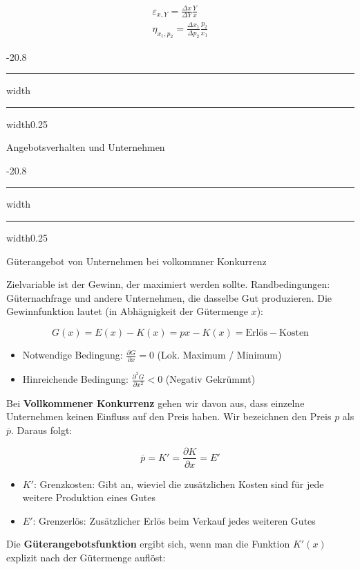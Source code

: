 \documentclass[9pt, landscape, fleqn]{scrartcl}
\makeatletter
\renewcommand{\section}{\@startsection{section}{1}{0mm}%
{-2\baselineskip}{0.8\baselineskip}%
{\hrule depth 0.2pt width\columnwidth\hrule depth1.5pt
width0.25\columnwidth\vspace*{1.2em}\Large\bfseries\rmfamily}}
\renewcommand{\subsection}{\@startsection{subsection}{1}{0mm}%
{-2\baselineskip}{0.8\baselineskip}%
{\hrule depth 0.2pt width\columnwidth\hrule depth0.75pt
width0.25\columnwidth\vspace*{1.2em}\large\bfseries\rmfamily}}
\makeatother
\begin{document}
\begin{multicols*}{3}
\begin{align}
    \varepsilon_{x,Y} = \frac{\Delta x}{\Delta Y} \frac{Y}{x} \\
    \eta_{x_1,p_2} = \frac{\Delta x_1}{\Delta p_2}\frac{p_2}{x_1}
\end{align}

\section{Angebotsverhalten und Unternehmen}

\subsection{Güterangebot von Unternehmen bei volkommner Konkurrenz}

Zielvariable ist der Gewinn, der maximiert werden sollte. Randbedingungen: Güternachfrage und andere Unternehmen, die dasselbe Gut produzieren. Die Gewinnfunktion lautet (in Abhägnigkeit der Gütermenge $x$): 

\begin{equation}
    G(x) = E(x) - K(x) = px -K(x)=  \text{Erlös} - \text{Kosten}
\end{equation}

\begin{itemize}
    \item Notwendige Bedingung: $\frac{\partial G}{\partial x} = 0$ (Lok. Maximum / Minimum)
    \item Hinreichende Bedingung: $\frac{\partial^2 G}{\partial x^2} < 0$ (Negativ Gekrümmt)
\end{itemize}

Bei \textbf{Vollkommener Konkurrenz} gehen wir davon aus, dass einzelne Unternehmen keinen Einfluss auf den Preis haben. Wir bezeichnen den Preis $p$ als $\overline{p}$. Daraus folgt:

\begin{equation}
    \overline{p} = K' = \frac{\partial K}{\partial x} = E'
\end{equation}

\begin{itemize}
    \item $K'$: Grenzkosten: Gibt an, wieviel die zusätzlichen Kosten sind für jede weitere Produktion eines Gutes 
    \item $E'$: Grenzerlös: Zusätzlicher Erlös beim Verkauf jedes weiteren Gutes 
\end{itemize}

Die \textbf{Güterangebotsfunktion} ergibt sich, wenn man die Funktion $K'(x)$ explizit nach der Gütermenge auflöst:


\end{multicols*}
\end{document}
